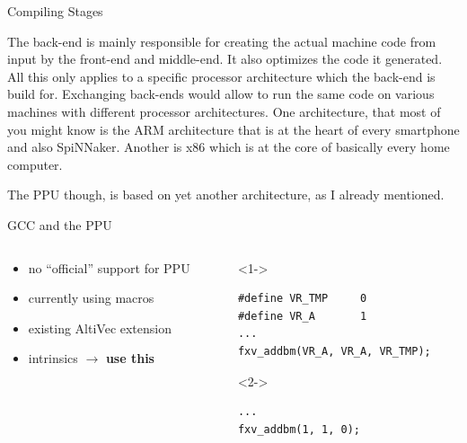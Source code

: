 \documentclass[10pt,aspectratio=169]{beamer}
\begin{document}
\begin{frame}[fragile]{Compiling Stages}
{		The back-end is mainly responsible for creating the actual machine code from input by the front-end and middle-end.
		It also optimizes the code it generated.
		All this only applies to a specific processor architecture which the back-end is build for.
		Exchanging back-ends would allow to run the same code on various machines with different processor architectures.
		One architecture, that most of you might know is the ARM architecture that is at the heart of every smartphone and also SpiNNaker.
		Another is x86 which is at the core of basically every home computer.

		The PPU though, is based on yet another architecture, as I already mentioned.}
\end{frame}

\begin{frame}[fragile]{GCC and the PPU}
    \begin{columns}[c]
    \begin{column}{0.5\textwidth}
        \begin{itemize}
			\setlength\itemsep{1em}
            \item no ``official'' support for PPU
			\item currently using macros
			\item<3-> existing AltiVec extension
			\item<4-> intrinsics $\rightarrow$ \textbf{use this}
        \end{itemize}
    \end{column}

    \begin{column}{0.5\textwidth}
        \centering
		\begin{visibleenv}<1->
				\begin{lstlisting}[title=Example for macro usage]
#define VR_TMP     0
#define VR_A       1
...
fxv_addbm(VR_A, VR_A, VR_TMP);
				\end{lstlisting}
	\end{visibleenv}

		\begin{visibleenv}<2->
				\begin{lstlisting}[title=Preprocessed example]
...
fxv_addbm(1, 1, 0);
				\end{lstlisting}
	\end{visibleenv}


\end{column}
\end{columns}
\end{frame}
\end{document}
